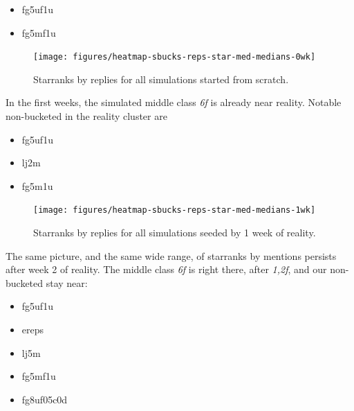 \documentclass[10pt,oneside]{memoir}
\begin{document}
\begin{itemize}


\item fg5uf1u

\item fg5mf1u
\end{itemize}


\begin{figure}
\begin{center}
    \texttt{[image: figures/heatmap-sbucks-reps-star-med-medians-0wk]}
    \caption{Starranks by replies for all simulations started from scratch.}
    \label{figure:heatmap-sbucks-reps-star-med-medians-0wk}
\end{center}
\end{figure}
In the first weeks, the simulated middle class {\itshape 6f} is already near reality.
Notable non-bucketed in the reality cluster are


\begin{itemize}


\item fg5uf1u

\item lj2m

\item fg5m1u
\end{itemize}


\begin{figure}
\begin{center}
    \texttt{[image: figures/heatmap-sbucks-reps-star-med-medians-1wk]}
    \caption{Starranks by replies for all simulations seeded by 1 week of reality.}
    \label{figure:heatmap-sbucks-reps-star-med-medians-1wk}
\end{center}
\end{figure}
The same picture, and the same wide range, of starranks by mentions persists after week 2 of reality.  The middle class {\itshape 6f} is right there, after {\itshape {1,2}f}, and our non-bucketed stay near:


\begin{itemize}


\item fg5uf1u

\item ereps

\item lj5m

\item fg5mf1u

\item fg8uf05c0d
\end{itemize}
\end{document}
